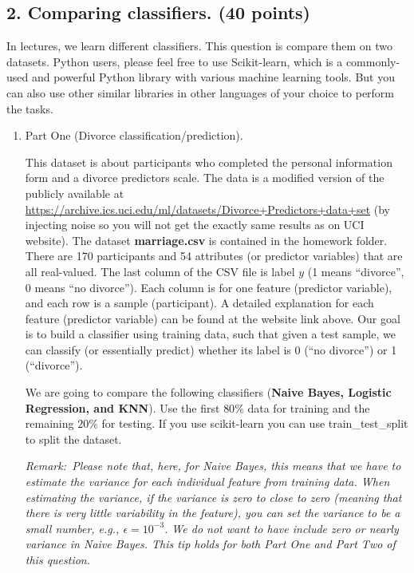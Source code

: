 \documentclass[twoside,10pt]{article}
\begin{document}
\subsection*{\bf 2. Comparing classifiers. (40 points)}

In lectures, we learn different classifiers. This question is compare them on two datasets. Python users, please feel free to use \textsf{Scikit-learn}, which is a commonly-used and powerful \textsf{Python} library with various machine learning tools. But you can also use other similar libraries in other languages of your choice to perform the tasks.

\begin{enumerate}


\item{Part One (Divorce classification/prediction).} 

This dataset is about participants who completed the personal information form and a divorce predictors scale.  The data is a modified version of the publicly available at  \url{https://archive.ics.uci.edu/ml/datasets/Divorce+Predictors+data+set} (by injecting noise so you will not get the exactly same results as on UCI website).  The dataset \textbf{marriage.csv} is contained in the homework folder. There are 170 participants and 54 attributes (or predictor variables) that are all real-valued. The last column of the CSV file is label $y$ (1 means ``divorce'', 0 means ``no divorce''). Each column is for one feature (predictor variable), and each row is a sample (participant). A detailed explanation for each feature (predictor variable) can be found at the website link above. Our goal is to build a classifier using training data, such that given a test sample, we can classify (or essentially predict) whether its label is 0 (``no divorce'') or 1 (``divorce''). 

We are going to compare the following classifiers  ({\bf Naive Bayes, Logistic Regression, and KNN}). Use the first $80\%$ data for training and the remaining $20\%$ for testing. If you use \textsf{scikit-learn} you can use \textsf{train\_test\_split} to split the dataset. 

\textit{Remark: Please note that, here, for Naive Bayes, this means that we have to estimate the variance for each individual feature from training data. When estimating the variance, if the variance is zero to close to zero (meaning that there is very little variability in the feature), you can set the variance to be a small number, e.g., $\epsilon = 10^{-3}$. We do not want to have include zero or nearly variance in Naive Bayes. This tip holds for both Part One and Part Two of this question.}



\end{enumerate}
\end{document}

